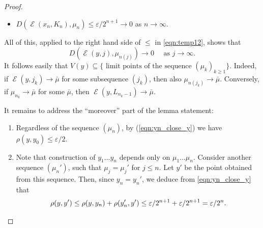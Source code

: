 \documentclass[10pt,a4paper]{amsart}
\DeclareMathOperator{\Emp}{\mathcal{E}}%
\newcommand{\eps}{\varepsilon}
\begin{document}
\begin{proof}
\begin{itemize}
\begin{itemize}
    \item[$\circ$] $D(\Emp(x_n, K_n), \mu_{n}) \le \eps / 2^{n+1} \to 0$ as $n \to \infty$.
  \end{itemize}
\end{itemize}
All of this, applied to the right hand side of $\le$ in \eqref{eqn:temp12}, shows that
\begin{equation}
D(\Emp(y, j), \mu_{n(j)}) \to 0 \quad \textrm{ as } j \to \infty.
\end{equation}
It follows easily that $V(y) \subseteq \{ \textrm{ limit points of the sequence } (\mu_k)_{k \geq 1} \}$. Indeed, if $\Emp(y, j_k) \to \bar{\mu}$ for some subsequence $(j_k)$, then also $\mu_{n(j_k)} \to \bar{\mu}$. Conversely, if $\mu_{n_k} \to \bar{\mu}$ for some $\bar{\mu}$, then $\Emp(y, L_{n_k - 1}) \to \bar{\mu}$.

It remains to address the ``moreover'' part of the lemma statement:
\begin{enumerate}
  \item Regardless of the sequence $(\mu_n)$, by (\ref{eqn:yn_close_y}) we have $\rho(y, y_0) \le \eps / 2$.
  \item Note that construction of $y_1 \dots y_n$ depends only on $\mu_1 \dots \mu_n$. Consider another sequence $(\mu_n')$, such that $\mu_j = \mu_j'$ for $j \le n$. Let $y'$ be the point obtained from this sequence. Then, since $y_n = y_n'$, we deduce from \eqref{eqn:yn_close_y} that
  \[
    \rho(y, y') \le \rho(y, y_n) + \rho(y_n', y') \le \eps /2^{n+1} + \eps /2^{n+1} = \eps / 2^n.
  \qedhere\]
\end{enumerate}
\end{proof}
\end{document}
